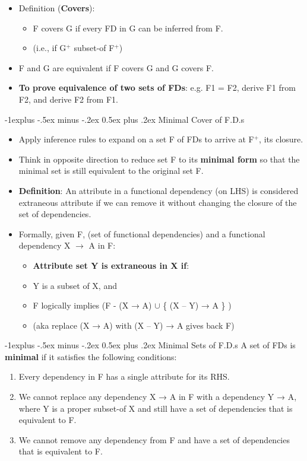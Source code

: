 \documentclass[12pt, landscape]{article}
\makeatletter
\renewcommand{\subsection}{\@startsection{subsection}{2}{0.1mm}%
                                {-1explus -.5ex minus -.2ex}%
                                {0.5ex plus .2ex}%
                                {\normalfont\normalsize\bfseries}}
\makeatother
\begin{document}
\begin{multicols*}{3}
\begin{itemize}
\item Definition (\textbf{Covers}):
\begin{itemize}
\item F covers G if every FD in G can be inferred from F.
\item (i.e., if G$^+$ subset-of F$^+$)
\end{itemize}

\item F and G are equivalent if F covers G and G covers F.
\item \textbf{To prove equivalence of two sets of FDs}: e.g. F1 = F2, derive F1 from F2, and derive F2 from F1.
\end{itemize}

\null \null
\columnbreak

\subsection{Minimal Cover of F.D.s}
\begin{itemize} 
\item Apply inference rules to expand on a set F of FDs to arrive at F$^+$, its closure.
\item Think in opposite direction to reduce set F to its \textbf{minimal form} so that the minimal set is still equivalent to the original set F.
\item \textbf{Definition}: An attribute in a functional dependency (on 
LHS) is considered extraneous attribute if we can remove it without changing the closure of the set of dependencies. 
\item Formally, given F, (set of functional dependencies) and a functional dependency X $\rightarrow$ A in F:
\medskip
\begin{itemize}
\item  \textbf{Attribute set Y is extraneous in X if}:
\item Y is a subset of X, and
\item F logically implies (F - (X → A) $\cup$ \{ (X – Y) → A \} )
\item (aka replace (X → A) with (X – Y) → A gives back F)
\end{itemize}
\end{itemize}

\subsection{Minimal Sets of F.D.s}
 A set of FDs is \textbf{minimal} if it satisfies the 
following conditions:
\begin{enumerate}
\item Every dependency in F has a single attribute for its RHS.
\item We cannot replace any dependency X → A in F 
with a dependency Y → A, where Y is a proper subset-of X and still have a set of dependencies that is equivalent to F.
\item We cannot remove any dependency from F and 
have a set of dependencies that is equivalent to F.
\end{enumerate}
\medskip


\end{multicols*}
\end{document}
